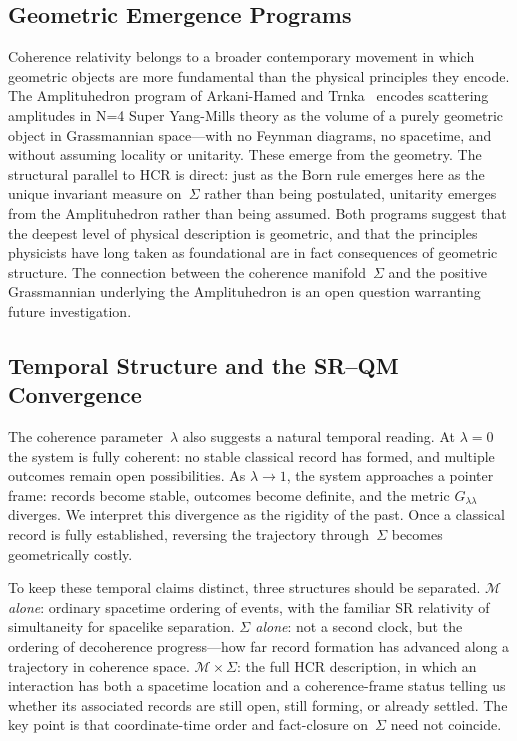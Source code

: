 \documentclass[aps,prd,twocolumn,superscriptaddress,nofootinbib,floatfix]{revtex4-2}
\newcommand{\Sig}{\Sigma}
\newcommand{\Gll}{G_{\lambda\lambda}}
\newcommand{\HCR}{HCR}
\newcommand{\CR}{\HCR}  %
\begin{document}
\subsection{Geometric Emergence Programs}

Coherence relativity belongs to a broader contemporary movement in which geometric objects are more fundamental than the physical principles they encode. The Amplituhedron program of Arkani-Hamed and Trnka~\cite{arkanihamedAmplituhedron2013} encodes scattering amplitudes in N=4 Super Yang-Mills theory as the volume of a purely geometric object in Grassmannian space---with no Feynman diagrams, no spacetime, and without assuming locality or unitarity. These emerge from the geometry. The structural parallel to \CR{} is direct: just as the Born rule emerges here as the unique invariant measure on~$\Sig$ rather than being postulated, unitarity emerges from the Amplituhedron rather than being assumed. Both programs suggest that the deepest level of physical description is geometric, and that the principles physicists have long taken as foundational are in fact consequences of geometric structure. The connection between the coherence manifold~$\Sig$ and the positive Grassmannian underlying the Amplituhedron is an open question warranting future investigation.


\subsection{Temporal Structure and the SR--QM Convergence}\label{sec:temporal}

The coherence parameter~$\lambda$ also suggests a natural temporal reading. At $\lambda = 0$ the system is fully coherent: no stable classical record has formed, and multiple outcomes remain open possibilities. As $\lambda \to 1$, the system approaches a pointer frame: records become stable, outcomes become definite, and the metric $\Gll$ diverges. We interpret this divergence as the rigidity of the past. Once a classical record is fully established, reversing the trajectory through~$\Sig$ becomes geometrically costly.

To keep these temporal claims distinct, three structures should be separated. \textit{$\mathcal{M}$ alone}: ordinary spacetime ordering of events, with the familiar SR relativity of simultaneity for spacelike separation. \textit{$\Sig$ alone}: not a second clock, but the ordering of decoherence progress---how far record formation has advanced along a trajectory in coherence space. \textit{$\mathcal{M} \times \Sig$}: the full HCR description, in which an interaction has both a spacetime location and a coherence-frame status telling us whether its associated records are still open, still forming, or already settled. The key point is that coordinate-time order and fact-closure on~$\Sig$ need not coincide.
 
\end{document}
